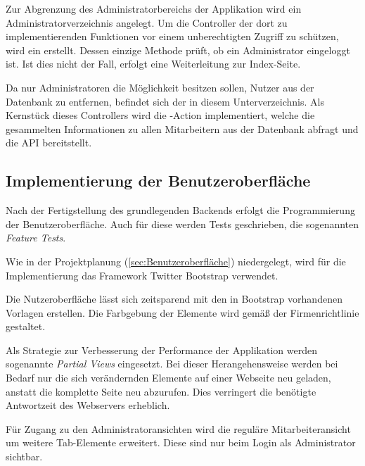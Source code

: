 
Zur Abgrenzung des Administratorbereichs der Applikation wird ein Administratorverzeichnis angelegt.
Um die Controller der dort zu implementierenden Funktionen vor einem unberechtigten Zugriff zu schützen, wird ein
 erstellt. Dessen einzige Methode prüft, ob ein Administrator eingeloggt ist.
Ist dies nicht der Fall, erfolgt eine Weiterleitung zur Index-Seite.

Da nur Administratoren die Möglichkeit besitzen sollen, Nutzer aus der Datenbank zu entfernen,
befindet sich der  in diesem Unterverzeichnis. Als Kernstück dieses
Controllers wird die -Action implementiert, welche die gesammelten Informationen
zu allen Mitarbeitern aus der Datenbank abfragt und die API bereitstellt.


\subsection{Implementierung der Benutzeroberfläche}
\label{sec:Implementierung der Benutzeroberfläche}
Nach der Fertigstellung des grundlegenden Backends erfolgt die Programmierung der Benutzeroberfläche.
Auch für diese werden Tests geschrieben, die sogenannten \textit{Feature Tests}.


Wie in der Projektplanung (\Vgl \ref{sec:Benutzeroberfläche}) niedergelegt, wird für die Implementierung
das Framework Twitter Bootstrap verwendet.

Die Nutzeroberfläche lässt sich zeitsparend mit den in Bootstrap vorhandenen Vorlagen erstellen. Die Farbgebung der Elemente wird gemäß der Firmenrichtlinie gestaltet.


Als Strategie zur Verbesserung der Performance der Applikation werden sogenannte
\textit{Partial Views} eingesetzt. Bei dieser Herangehensweise werden bei Bedarf nur die sich
verändernden Elemente auf einer Webseite neu geladen, anstatt die komplette Seite neu abzurufen.
Dies verringert die benötigte Antwortzeit des Webservers erheblich.

Für Zugang zu den Administratoransichten wird die reguläre Mitarbeiteransicht um weitere Tab-Elemente
erweitert. Diese sind nur beim Login als Administrator sichtbar.

